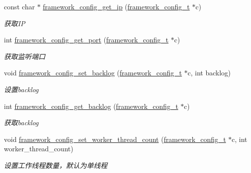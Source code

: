 \begin{DoxyCompactItemize}
const char $\ast$ \hyperlink{a00048_a4a950b4ce87471eda9a85d7be33ec67a_a4a950b4ce87471eda9a85d7be33ec67a}{framework\+\_\+config\+\_\+get\+\_\+ip} (\hyperlink{a00047_a55b26efa9e6ee05514d087ba2593a54b_a55b26efa9e6ee05514d087ba2593a54b}{framework\+\_\+config\+\_\+t} $\ast$c)
\begin{DoxyCompactList}\small\item\em 获取\+I\+P \end{DoxyCompactList}\item 
int \hyperlink{a00048_a84c24d4b8c5e5d03e1942277d21743e5_a84c24d4b8c5e5d03e1942277d21743e5}{framework\+\_\+config\+\_\+get\+\_\+port} (\hyperlink{a00047_a55b26efa9e6ee05514d087ba2593a54b_a55b26efa9e6ee05514d087ba2593a54b}{framework\+\_\+config\+\_\+t} $\ast$c)
\begin{DoxyCompactList}\small\item\em 获取监听端口 \end{DoxyCompactList}\item 
void \hyperlink{a00093_gafdcba98785a6e0c7729c14eac004c1e3_gafdcba98785a6e0c7729c14eac004c1e3}{framework\+\_\+config\+\_\+set\+\_\+backlog} (\hyperlink{a00047_a55b26efa9e6ee05514d087ba2593a54b_a55b26efa9e6ee05514d087ba2593a54b}{framework\+\_\+config\+\_\+t} $\ast$c, int backlog)
\begin{DoxyCompactList}\small\item\em 设置backlog \end{DoxyCompactList}\item 
int \hyperlink{a00048_a7e20403dae6bc1195d506af7909641b4_a7e20403dae6bc1195d506af7909641b4}{framework\+\_\+config\+\_\+get\+\_\+backlog} (\hyperlink{a00047_a55b26efa9e6ee05514d087ba2593a54b_a55b26efa9e6ee05514d087ba2593a54b}{framework\+\_\+config\+\_\+t} $\ast$c)
\begin{DoxyCompactList}\small\item\em 获取backlog \end{DoxyCompactList}\item 
void \hyperlink{a00093_ga46fc5d54c72138bced5ddd4068ef77e5_ga46fc5d54c72138bced5ddd4068ef77e5}{framework\+\_\+config\+\_\+set\+\_\+worker\+\_\+thread\+\_\+count} (\hyperlink{a00047_a55b26efa9e6ee05514d087ba2593a54b_a55b26efa9e6ee05514d087ba2593a54b}{framework\+\_\+config\+\_\+t} $\ast$c, int worker\+\_\+thread\+\_\+count)
\begin{DoxyCompactList}\small\item\em 设置工作线程数量，默认为单线程 \end{DoxyCompactList}\item 

\end{DoxyCompactItemize}
